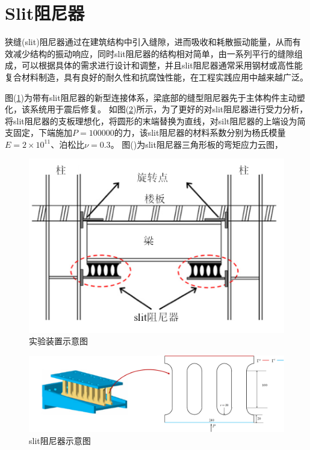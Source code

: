 \section{Slit阻尼器}
狭缝(slit)阻尼器通过在建筑结构中引入缝隙，进而吸收和耗散振动能量，从而有效减少结构的振动响应，同时slit阻尼器的结构相对简单，由一系列平行的缝隙组成，可以根据具体的需求进行设计和调整，并且slit阻尼器通常采用钢材或高性能复合材料制造，具有良好的耐久性和抗腐蚀性能，在工程实践应用中越来越广泛。\par
图(\ref{slit1})为带有slit阻尼器的新型连接体系，梁底部的缝型阻尼器先于主体构件主动塑化，该系统用于震后修复。
如图(\ref{slit2})所示，为了更好的对slit阻尼器进行受力分析，将slit阻尼器的支板理想化，将圆形的末端替换为直线，对silt阻尼器的上端设为简支固定，下端施加$P=100000$的力，该slit阻尼器的材料系数分别为杨氏模量$E=2\times 10^{11}$、泊松比$\nu=0.3$。
图()为slit阻尼器三角形板的弯矩应力云图，
\begin{figure}[H]
    \centering
    \includegraphics[scale=0.6]{figure/DAMPER/SLIT/1.png}
    \caption{实验装置示意图\cite{oh2009}}\label{slit1}
\end{figure}
\begin{figure}[H]
    \centering
    \includegraphics[scale=0.5]{figure/DAMPER/SLIT/2.png}
    \caption{slit阻尼器示意图}\label{slit2}
\end{figure}
